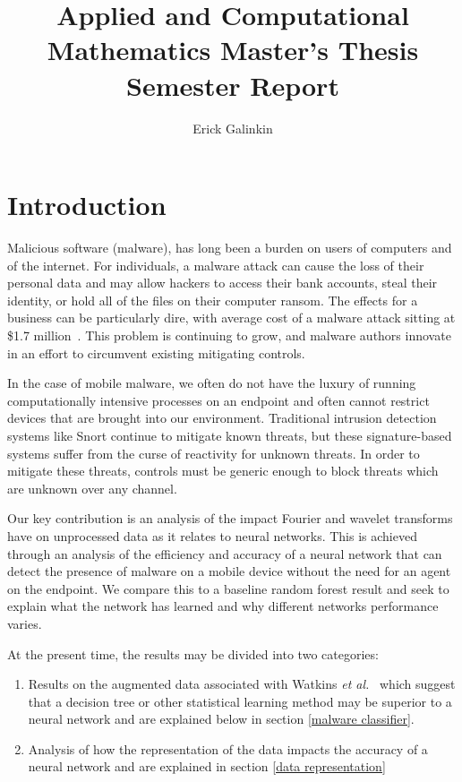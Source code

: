\documentclass[10pt]{article}
\begin{document}
\title{Applied and Computational Mathematics Master's Thesis Semester Report}
\author{Erick Galinkin}
\maketitle

\section{Introduction}
Malicious software (malware), has long been a burden on users of computers and of  the internet.
For individuals, a malware attack can cause the loss of their personal data and may allow hackers to access their bank accounts, steal their identity, or hold all of the files on their computer ransom.
The effects for a business can be particularly dire, with average cost of a malware attack sitting at \$1.7 million~\cite{seals2019threatlist}.
This problem is continuing to grow, and malware authors innovate in an effort to circumvent existing mitigating controls.

In the case of mobile malware, we often do not have the luxury of running computationally intensive processes on an endpoint and often cannot restrict devices that are brought into our environment.
 Traditional intrusion detection systems like Snort continue to mitigate known threats, but these signature-based systems suffer from the curse of reactivity for unknown threats.
 In order to mitigate these threats, controls must be generic enough to block threats which are unknown over any channel.

Our key contribution is an analysis of the impact Fourier and wavelet transforms have on unprocessed data as it relates to neural networks. 
This is achieved through an analysis of the efficiency and accuracy of a neural network that can detect the presence of malware on a mobile device without the need for an agent on the endpoint.
We compare this to a baseline random forest result and seek to explain what the network has learned and why different networks performance varies.

At the present time, the results may be divided into two categories:
\begin{enumerate}
\item Results on the augmented data associated with Watkins \textit{et al.}~\cite{watkins2018network} which suggest that a decision tree or other statistical learning method may be superior to a neural network and are explained below in section \ref{malware classifier}.
\item Analysis of how the representation of the data impacts the accuracy of a neural network and are explained in section \ref{data representation}
\end{enumerate}
\end{document}
